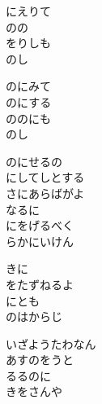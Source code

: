 \documentclass[10pt,b5j]{tarticle} %
\begin{document}
\vspace{1.5em} %
\newcommand{\linespace}{0.5em} %
\newcommand{\blocksize}{0.5\hsize} %
\begin{enumerate} %
    \begin{minipage}[c]{\blocksize}
    
        \vspace{\linespace}
        \item
        にえりて\\
        のの\\
        をりしも\\
        のし
        
        \vspace{\linespace}
        \item
        のにみて\\
        のにする\\
        ののにも\\
        のし
        
        \vspace{\linespace}
        \item
        のにせるの\\
        にしてしとする\\
        さにあらばがよ\\
        なるに\\
        にをげるべく\\
        らかにいけん
        
        \vspace{\linespace}
        \item
        きに\\
        をたずねるよ\\
        にとも\\
        のはからじ
        
        \vspace{\linespace}
        \item
        いざようたわなん\\
        あすのをうと\\
        るるのに\\
        きをさんや
    
    \end{minipage}
\end{enumerate} %
\end{document}
